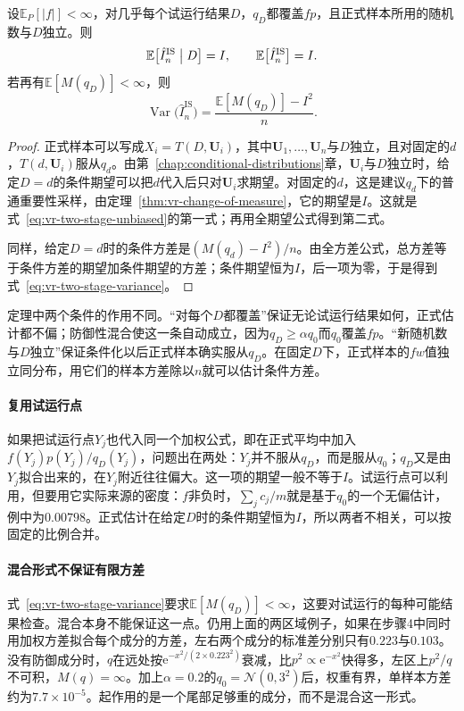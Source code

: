 \begin{theorem}[两阶段估计的无偏性]
\label{thm:vr-two-stage}
设$\mathbb{E}_P[\lvert f\rvert]<\infty$，对几乎每个试运行结果$D$，$q_D$都覆盖$fp$，且正式样本所用的随机数与$D$独立。则
\begin{equation}
 \mathbb{E}\bigl[\hat{I}_n^{\mathrm{IS}}\bigm|D\bigr]=I,\qquad \mathbb{E}\bigl[\hat{I}_n^{\mathrm{IS}}\bigr]=I .
 \label{eq:vr-two-stage-unbiased}
\end{equation}
若再有$\mathbb{E}[M(q_D)]<\infty$，则
\begin{equation}
 \operatorname{Var}\bigl(\hat{I}_n^{\mathrm{IS}}\bigr)=\frac{\mathbb{E}[M(q_D)]-I^2}{n} .
 \label{eq:vr-two-stage-variance}
\end{equation}
\end{theorem}

\begin{proof}
正式样本可以写成$X_i=T(D,\bm{U}_i)$，其中$\bm{U}_1,\dots,\bm{U}_n$与$D$独立，且对固定的$d$，$T(d,\bm{U}_i)$服从$q_d$。由第~\ref{chap:conditional-distributions}章，$\bm{U}_i$与$D$独立时，给定$D=d$的条件期望可以把$d$代入后只对$\bm{U}_i$求期望。对固定的$d$，这是建议$q_d$下的普通重要性采样，由定理~\ref{thm:vr-change-of-measure}，它的期望是$I$。这就是式~\eqref{eq:vr-two-stage-unbiased}的第一式；再用全期望公式得到第二式。

同样，给定$D=d$时的条件方差是$(M(q_d)-I^2)/n$。由全方差公式，总方差等于条件方差的期望加条件期望的方差；条件期望恒为$I$，后一项为零，于是得到式~\eqref{eq:vr-two-stage-variance}。
\end{proof}

定理中两个条件的作用不同。“对每个$D$都覆盖”保证无论试运行结果如何，正式估计都不偏；防御性混合使这一条自动成立，因为$q_D\geq\alpha q_0$而$q_0$覆盖$fp$。“新随机数与$D$独立”保证条件化以后正式样本确实服从$q_D$。在固定$D$下，正式样本的$f w$值独立同分布，用它们的样本方差除以$n$就可以估计条件方差。

\paragraph{复用试运行点}
如果把试运行点$Y_j$也代入同一个加权公式，即在正式平均中加入$f(Y_j)p(Y_j)/q_D(Y_j)$，问题出在两处：$Y_j$并不服从$q_D$，而是服从$q_0$；$q_D$又是由$Y_j$拟合出来的，在$Y_j$附近往往偏大。这一项的期望一般不等于$I$。试运行点可以利用，但要用它实际来源的密度：$f$非负时，$\sum_jc_j/m$就是基于$q_0$的一个无偏估计，例中为$0.00798$。正式估计在给定$D$时的条件期望恒为$I$，所以两者不相关，可以按固定的比例合并。

\paragraph{混合形式不保证有限方差}
式~\eqref{eq:vr-two-stage-variance}要求$\mathbb{E}[M(q_D)]<\infty$，这要对试运行的每种可能结果检查。混合本身不能保证这一点。仍用上面的两区域例子，如果在步骤4中同时用加权方差拟合每个成分的方差，左右两个成分的标准差分别只有$0.223$与$0.103$。没有防御成分时，$q$在远处按$\mathrm{e}^{-x^2/(2\times0.223^2)}$衰减，比$p^2\propto\mathrm{e}^{-x^2}$快得多，左区上$p^2/q$不可积，$M(q)=\infty$。加上$\alpha=0.2$的$q_0=\mathcal{N}(0,3^2)$后，权重有界，单样本方差约为$7.7\times10^{-5}$。起作用的是一个尾部足够重的成分，而不是混合这一形式。

